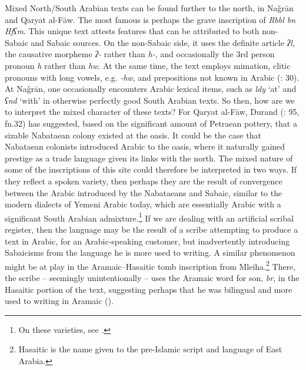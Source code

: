 \documentclass[output=paper]{langsci/langscibook}
\begin{document}
Mixed North/South Arabian texts can be found further to the north, in Naǧrān and Qaryat al-Fāw. The most famous is perhaps the grave inscription of \textit{Rbbl bn Hfʕm}. This unique text attests features that can be attributed to both non-Sabaic and Sabaic sources. On the non-Sabaic side, it uses the definite article \textit{ʔl}, the causative morpheme \textit{ʔ-} rather than \textit{h-}, and occasionally the 3rd person pronoun \textit{h} rather than \textit{hw}. At the same time, the text employs mimation, clitic pronouns with long vowels, e.g. \textit{-hw}, and prepositions not known in Arabic (\citealt{Al-Jallad2018ANA}: 30). At Naǧrān, one occasionally encounters Arabic lexical items, such as \textit{ldy} ‘at’ and \textit{ʕnd} ‘with’ in otherwise perfectly good South Arabian texts. So then, how are we to interpret the mixed character of these texts? For Qaryat al-Fāw, Durand (\citeyear{Durand2017}: 95, fn.32) has suggested, based on the significant amount of Petraean pottery, that a sizable Nabataean colony existed at the oasis. It could be the case that Nabataean colonists introduced Arabic to the oasis, where it naturally gained prestige as a trade language given its links with the north. The mixed nature of some of the inscriptions of this site could therefore be interpreted in two ways. If they reflect a spoken variety, then perhaps they are the result of convergence between the Arabic introduced by the Nabataeans and Sabaic, similar to the modern dialects of Yemeni Arabic today, which are essentially Arabic with a significant South Arabian admixture.\footnote{On these varieties, see \citet{Watson2018}.} If we are dealing with an artificial scribal register, then the language may be the result of a scribe attempting to produce a text in Arabic, for an Arabic-speaking customer, but inadvertently introducing Sabaicisms from the language he is more used to writing. A similar phenomenon might be at play in the Aramaic–Hasaitic tomb inscription from Mleiha.\footnote{Hasaitic is the name given to the pre-Islamic script and language of East Arabia.} There, the scribe – seemingly unintentionally – uses the Aramaic word for son, \textit{br}, in the Hasaitic portion of the text, suggesting perhaps that he was bilingual and more used to writing in Aramaic (\citealt{Overlaetetal2016}).
\end{document}
